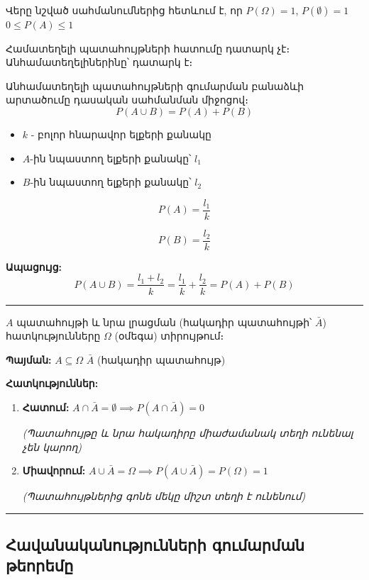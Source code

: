 \documentclass[12pt, a4paper]{article}
\begin{document}
Վերը նշված սահմանումներից հետևում է, որ 
$P(\Omega) = 1$, $P(\emptyset) = 1$
$0 \leq P(A) \leq 1$

Համատեղելի պատահույթների հատումը դատարկ չէ։ Անհամատեղելիներինը՝ դատարկ է։

Անհամատեղելի պատահույթների գումարման բանաձևի արտածումը դասական սահմանման միջոցով։
$$P(A \cup B) = P(A) + P(B)$$
\begin{itemize}
    \item $k$ - բոլոր հնարավոր ելքերի քանակը
    \item $A$-ին նպաստող ելքերի քանակը՝ $l_1$
    \item $B$-ին նպաստող ելքերի քանակը՝ $l_2$
\end{itemize}

$$P(A) = \frac{l_1}{k}$$

$$P(B) = \frac{l_2}{k}$$

\textbf{Ապացույց:}
$$P(A \cup B) = \frac{l_1 + l_2}{k} = \frac{l_1}{k} + \frac{l_2}{k} = P(A) + P(B)$$

\vspace{1em}
\hrule
\vspace{1em}

$A$ պատահույթի և նրա լրացման (հակադիր պատահույթի՝ $\bar{A}$) հատկությունները $\Omega$ (օմեգա) տիրույթում։

\textbf{Պայման:}
$A \subseteq \Omega$
$\bar{A}$ (հակադիր պատահույթ)

\textbf{Հատկություններ:}

\begin{enumerate}
    \item \textbf{Հատում:} $A \cap \bar{A} = \emptyset \implies P(A \cap \bar{A}) = 0$
    
    \textit{(Պատահույթը և նրա հակադիրը միաժամանակ տեղի ունենալ չեն կարող)}
    
    \item \textbf{Միավորում:} $A \cup \bar{A} = \Omega \implies P(A \cup \bar{A}) = P(\Omega) = 1$
    
    \textit{(Պատահույթներից գոնե մեկը միշտ տեղի է ունենում)}
\end{enumerate}

\vspace{1em}
\hrule
\vspace{1em}

\subsection{Հավանականությունների գումարման թեորեմը}
\end{document}

